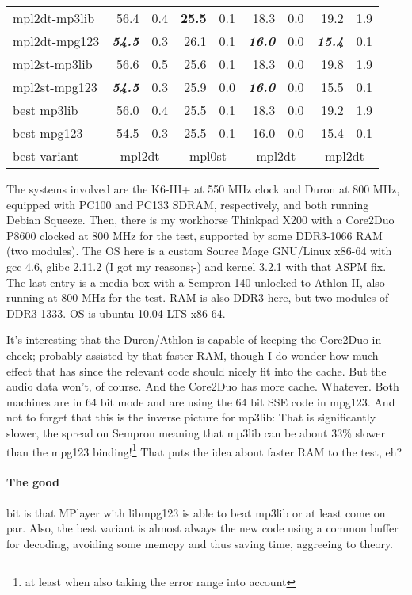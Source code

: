 \documentclass[a4paper,12pt]{scrartcl}
\newcommand{\ccenter}[1]{\multicolumn{2}{c}{#1}}
\begin{document}
\begin{center}
\begin{tabular}{lrrrrrrrr}
\midrule
mpl2dt-mp3lib & 56.4&0.4 & \textbf{25.5}&0.1      & 18.3&0.0               & 19.2&1.9 \\
mpl2dt-mpg123 & \textbf{\em{54.5}}&0.3 & 26.1&0.1 & \textbf{\em{16.0}}&0.0 & \textbf{\em{15.4}}&0.1 \\
mpl2st-mp3lib & 56.6&0.5 & 25.6&0.1               & 18.3&0.0               & 19.8&1.9 \\
mpl2st-mpg123 & \textbf{\em{54.5}}&0.3 & 25.9&0.0 & \textbf{\em{16.0}}&0.0 & 15.5&0.1 \\
\midrule
best mp3lib & 56.0&0.4   & 25.5&0.1 & 18.3&0.0 & 19.2&1.9 \\
best mpg123 & 54.5&0.3   & 25.5&0.1 & 16.0&0.0 & 15.4&0.1 \\
best variant & \ccenter{mpl2dt} & \ccenter{mpl0st} & \ccenter{mpl2dt} & \ccenter{mpl2dt}
\end{tabular}
\end{center}
The systems involved are the K6-III+ at 550 MHz clock and Duron at 800 MHz, equipped with PC100 and PC133 SDRAM, respectively, and both running Debian Squeeze.
Then, there is my workhorse Thinkpad X200 with a Core2Duo P8600 clocked at 800 MHz for the test, supported by some DDR3-1066 RAM (two modules).
The OS here is a custom Source Mage GNU/Linux x86-64 with gcc 4.6, glibc 2.11.2 (I got my reasons;-) and kernel 3.2.1 with that ASPM fix.
The last entry is a media box with a Sempron 140 unlocked to Athlon II, also running at 800 MHz for the test. RAM is also DDR3 here, but two modules of DDR3-1333. OS is ubuntu 10.04 LTS x86-64.

It's interesting that the Duron/Athlon is capable of keeping the Core2Duo in check; probably assisted by that faster RAM, though I do wonder how much effect that has since the relevant code should nicely fit into the cache. But the audio data won't, of course. And the Core2Duo has more cache. Whatever.
Both machines are in 64 bit mode and are using the 64 bit SSE code in mpg123.
And not to forget that this is the inverse picture for mp3lib: That is significantly slower, the spread on Sempron meaning that mp3lib can be about 33\% slower than the mpg123 binding!\footnote{at least when also taking the error range into account}
That puts the idea about faster RAM to the test, eh?

\paragraph{The good}
bit is that MPlayer with libmpg123 is able to beat mp3lib or at least come on par.
Also, the best variant is almost always the new code using a common buffer for decoding, avoiding some memcpy and thus saving time, aggreeing to theory.
\end{document}
